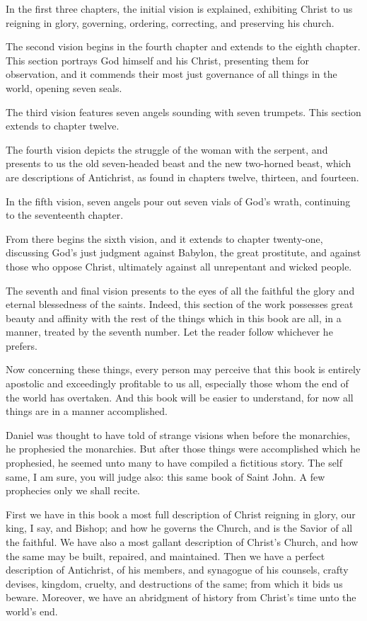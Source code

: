 In the first three chapters, the initial vision is explained, exhibiting Christ to us reigning in glory, governing, ordering, correcting, and preserving his church.

The second vision begins in the fourth chapter and extends to the eighth chapter. This section portrays God himself and his Christ, presenting them for observation, and it commends their most just governance of all things in the world, opening seven seals.

The third vision features seven angels sounding with seven trumpets. This section extends to chapter twelve.

The fourth vision depicts the struggle of the woman with the serpent, and presents to us the old seven-headed beast and the new two-horned beast, which are descriptions of Antichrist, as found in chapters twelve, thirteen, and fourteen.

In the fifth vision, seven angels pour out seven vials of God’s wrath, continuing to the seventeenth chapter.

From there begins the sixth vision, and it extends to chapter twenty-one, discussing God’s just judgment against Babylon, the great prostitute, and against those who oppose Christ, ultimately against all unrepentant and wicked people.

The seventh and final vision presents to the eyes of all the faithful the glory and eternal blessedness of the saints. Indeed, this section of the work possesses great beauty and affinity with the rest of the things which in this book are all, in a manner, treated by the seventh number. Let the reader follow whichever he prefers.

Now concerning these things, every person may perceive that this book is entirely apostolic and exceedingly profitable to us all, especially those whom the end of the world has overtaken. And this book will be easier to understand, for now all things are in a manner accomplished.

Daniel was thought to have told of strange visions when before the monarchies, he prophesied the monarchies. But after those things were accomplished which he prophesied, he seemed unto many to have compiled a fictitious story. The self same, I am sure, you will judge also: this same book of Saint John. A few prophecies only we shall recite.

First we have in this book a most full description of Christ reigning in glory, our king, I say, and Bishop; and how he governs the Church, and is the Savior of all the faithful. We have also a most gallant description of Christ’s Church, and how the same may be built, repaired, and maintained. Then we have a perfect description of Antichrist, of his members, and synagogue of his counsels, crafty devises, kingdom, cruelty, and destructions of the same; from which it bids us beware. Moreover, we have an abridgment of history from Christ’s time unto the world’s end.

